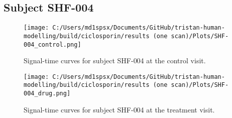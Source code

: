 \documentclass{epflreport}%
\begin{document}
\subsection{Subject SHF{-}004}%
\label{subsec:SubjectSHF{-}004}%

%


\begin{figure}[h!]%
\centering%
\texttt{[image: C:/Users/md1spsx/Documents/GitHub/tristan-human-modelling/build/ciclosporin/results (one scan)/Plots/SHF-004\_control.png]}%
\caption{Signal{-}time curves for subject SHF{-}004 at the control visit.}%
\end{figure}

%


\begin{figure}[h!]%
\centering%
\texttt{[image: C:/Users/md1spsx/Documents/GitHub/tristan-human-modelling/build/ciclosporin/results (one scan)/Plots/SHF-004\_drug.png]}%
\caption{Signal{-}time curves for subject SHF{-}004 at the treatment visit.}%
\end{figure}
\end{document}
